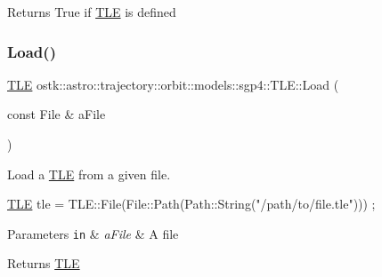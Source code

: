 \begin{DoxyReturn}{Returns}
True if \hyperlink{classostk_1_1astro_1_1trajectory_1_1orbit_1_1models_1_1sgp4_1_1_t_l_e}{T\+LE} is defined 
\end{DoxyReturn}
\mbox{\label{classostk_1_1astro_1_1trajectory_1_1orbit_1_1models_1_1sgp4_1_1_t_l_e_a5e912145266460d05beaba326b5ace95}} 
\subsubsection{\texorpdfstring{Load()}{Load()}}
{\footnotesize\ttfamily \hyperlink{classostk_1_1astro_1_1trajectory_1_1orbit_1_1models_1_1sgp4_1_1_t_l_e}{T\+LE} ostk\+::astro\+::trajectory\+::orbit\+::models\+::sgp4\+::\+T\+L\+E\+::\+Load (\begin{DoxyParamCaption}\item[{const File \&}]{a\+File }\end{DoxyParamCaption})\hspace{0.3cm}{\ttfamily [static]}}



Load a \hyperlink{classostk_1_1astro_1_1trajectory_1_1orbit_1_1models_1_1sgp4_1_1_t_l_e}{T\+LE} from a given file. 


\begin{DoxyCode}
\hyperlink{classostk_1_1astro_1_1trajectory_1_1orbit_1_1models_1_1sgp4_1_1_t_l_e_a57323db2c24577c2e8ddce79fa776d1e}{TLE} tle = TLE::File(File::Path(Path::String(\textcolor{stringliteral}{"/path/to/file.tle"}))) ;
\end{DoxyCode}



\begin{DoxyParams}[1]{Parameters}
\mbox{\tt in}  & {\em a\+File} & A file \\
\hline
\end{DoxyParams}
\begin{DoxyReturn}{Returns}
\hyperlink{classostk_1_1astro_1_1trajectory_1_1orbit_1_1models_1_1sgp4_1_1_t_l_e}{T\+LE} 
\end{DoxyReturn}
\mbox{\label{classostk_1_1astro_1_1trajectory_1_1orbit_1_1models_1_1sgp4_1_1_t_l_e_a3b15abd9b07fb2a0851b680fe23da8f6}} 
